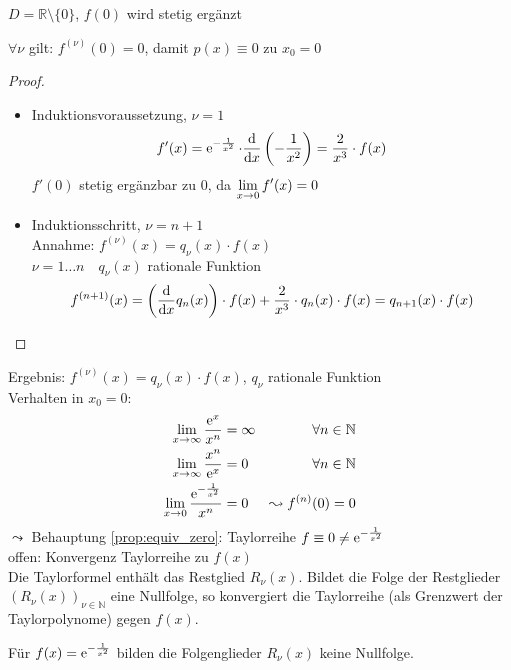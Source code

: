\noindent $D=\mathbb{R}\setminus \{0\}$, $f(0)$ wird stetig ergänzt
\begin{proposition}\label{prop:equiv_zero}
  $\forall \nu$ gilt: $f^{(\nu)}(0) = 0$, damit $p(x) \equiv 0 \text{ zu } x_0 = 0$
\end{proposition}

\begin{proof}
  \begin{itemize}
    \item Induktionsvoraussetzung, $\nu = 1$
      \[ f'(x) = \operatorname{e}^{-\frac{1}{x^2}}\cdot \frac{\mathrm d}{\mathrm d x}\left(-\frac{1}{x^2}\right) = \frac{2}{x^3}\cdot f(x) \]
      $f'(0)$ stetig ergänzbar zu $0$, da $\displaystyle\lim_{x \rightarrow 0} f'(x) = 0$
    \item Induktionsschritt, $\nu = n + 1$\\
      Annahme: $f^{(\nu)}(x) = q_\nu(x)\cdot f(x)$\\
      $\nu=1\ldots n \quad q_\nu(x)$ rationale Funktion
      \[
        f^{(n+1)}(x) = \left(\frac{\mathrm d}{\mathrm d x} q_n(x)\right)\cdot f(x) + \frac{2}{x^3} \cdot q_n(x) \cdot f(x)= q_{n+1}(x) \cdot f(x)
      \]
  \end{itemize}
\end{proof}
\noindent Ergebnis: $f^{(\nu)}(x) = q_\nu(x)\cdot f(x)$, $q_\nu$ rationale Funktion\\
Verhalten in $x_0 = 0$:
\begin{align*}
   \lim_{x\rightarrow \infty} \frac{\operatorname{e}^x}{x^n} & = \infty & \forall n \in \mathbb{N}\\
   \lim_{x\rightarrow \infty} \frac{x^n}{\operatorname{e}^x} & = 0 & \forall n \in \mathbb{N}\\
   \lim_{x\rightarrow 0} \frac{\operatorname{e}^{-\frac{1}{x^2}}}{x^n} & = 0 & \leadsto f^{(n)}(0) = 0
\end{align*}
$\leadsto$ Behauptung \ref{prop:equiv_zero}: Taylorreihe $f \equiv 0 \neq \operatorname{e}^{-\frac{1}{x^2}}$\\
offen: Konvergenz Taylorreihe zu $f(x)$\\
Die Taylorformel enthält das Restglied $R_\nu(x)$. Bildet die Folge der Restglieder $(R_\nu(x))_{\nu \in \mathbb{N}}$ eine Nullfolge, so konvergiert die Taylorreihe (als Grenzwert der Taylorpolynome) gegen $f(x)$.

\begin{note}Für $f(x) = \operatorname{e}^{-\frac{1}{x^2}}$ bilden die Folgenglieder $R_\nu(x)$ keine Nullfolge.\end{note}

%
%
